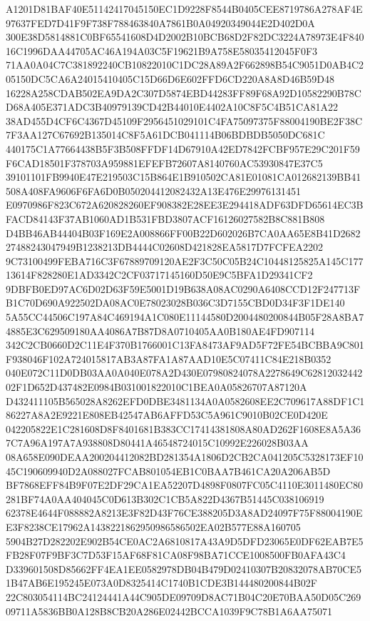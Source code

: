 \documentclass[UTF8,fontset=fandol,zihao=-4,a4paper]{ctexart}
\begin{document}
{{A1201D81BAF40E51142417045150EC1D9228F8544B0405CEE8719786A278AF4E97637FED7D41F9F738F788463840A7861B0A04920349044E2D402D0A
300E38D5814881C0BF65541608D4D2002B10BCB68D2F82DC3224A78973E4F84016C1996DAA44705AC46A194A03C5F19621B9A758E58035412045F0F3
71AA0A04C7C381892240CB10822010C1DC28A89A2F662898B54C9051D0AB4C205150DC5CA6A24015410405C15D66D6E602FFD6CD220A8A8D46B59D48
16228A258CDAB502EA9DA2C307D5874EBD44283FF89F68A92D10582290B78CD68A405E371ADC3B40979139CD42B44010E4402A10C8F5C4B51CA81A22
38AD455D4CF6C4367D45109F2956451029101C4FA75097375F88004190BE2F38C7F3AA127C67692B135014C8F5A61DCB041114B06BDBDB5050DC681C
440175C1A77664438B5F3B508FFDF14D67910A42ED7842FCBF957E29C201F59F6CAD18501F378703A959881EFEFB72607A8140760AC53930847E37C5
39101101FB9940E47E219503C15B864E1B910502CA81E01081CA012682139BB41508A408FA9606F6FA6D0B050204412082432A13E476E29976131451
E0970986F823C672A620828260EF908382E28EE3E294418ADF63DFD65614EC3BFACD84143F37AB1060AD1B531FBD3807ACF16126027582B8C881B808
D4BB46AB44404B03F169E2A008866FF00B22D602026B7CA0AA65E8B41D268227488243047949B1238213DB4444C02608D421828EA5817D7FCFEA2202
9C73100499FEBA716C3F67889709120AE2F3C50C05B24C10448125825A145C17713614F828280E1AD3342C2CF03717145160D50E9C5BFA1D29341CF2
9DBFB0ED97AC6D02D63F59E5001D19B638A08AC0290A6408CCD12F247713FB1C70D690A922502DA08AC0E78023028B036C3D7155CBD0D34F3F1DE140
5A55CC44506C197A84C469194A1C080E11144580D2004480200844B05F28A8BA74885E3C629509180AA4086A7B87D8A0710405AA0B180AE4FD907114
342C2CB0660D2C11E4F370B1766001C13FA8473AF9AD5F72FE54BCBBA9C801F938046F102A724015817AB3A87FA1A87AAD10E5C07411C84E218B0352
040E072C11D0DB03AA0A040E078A2D430E07980824078A2278649C6281203244202F1D652D437482E0984B031001822010C1BEA0A05826707A87120A
D432411105B565028A8262EFD0DBE3481134A0A0582608EE2C709617A88DF1C186227A8A2E9221E808EB42547AB6AFFD53C5A961C9010B02CE0D420E
042205822E1C281608D8F8401681B383CC17414381808A80AD262F1608E8A5A367C7A96A197A7A938808D80441A46548724015C10992E226028B03AA
08A658E090DEAA200204412082BD281354A1806D2CB2CA041205C5328173EF1045C190609940D2A088027FCAB801054EB1C0BAA7B461CA20A206AB5D
BF7868EFF84B9F07E2DF29CA1EA52207D4898F0807FC05C4110E3011480EC80281BF74A0AA404045C0D613B302C1CB5A822D4367B51445C038106919
62378E4644F088882A8213E3F82D43F76CE388205D3A8AD24097F75F88004190EE3F8238CE17962A1438221862950986586502EA02B577E88A160705
5904B27D282202E902B54CE0AC2A6810817A43A9D5DFD23065E0DF62EAB7E5FB28F07F9BF3C7D53F15AF68F81CA08F98BA71CCE1008500FB0AFA43C4
D339601508D85662FF4EA1EE0582978DB04B479D02410307B20832078AB70CE51B47AB6E195245E073A0D8325414C1740B1CDE3B144480200844B02F
22C803054114BC24124441A44C905DE09709D8AC71B04C20E70BAA50D05C26909711A5836BB0A128B8CB20A286E02442BCCA1039F9C78B1A6AA75071
}}
\end{document}
